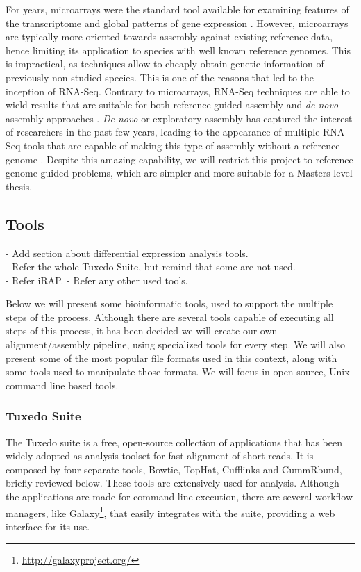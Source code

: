 For years, microarrays were the standard tool available for examining features
of the transcriptome and global patterns of gene expression \cite{Wolf2013}.
However, microarrays are typically more oriented towards assembly against
existing reference data, hence limiting its application to species with well
known reference genomes. This is impractical, as \ngs{} techniques allow to
cheaply obtain genetic information of previously non-studied species. This is
one of the reasons that led to the inception of RNA-Seq. Contrary to
microarrays, RNA-Seq techniques are able to wield results that are suitable for
both reference guided assembly and \textit{de novo} assembly approaches
\cite{Wilhelm2009}. \textit{De novo} or exploratory assembly has captured the
interest of researchers in the past few years, leading to the appearance of
multiple RNA-Seq tools that are capable of making this type of assembly without
a reference genome \cite{nuno11:assemblathon}. Despite this amazing capability,
we will restrict this project to reference genome guided problems, which are
simpler and more suitable for a Masters level thesis.

\subsection{\rnaseq{} Tools}\label{sec:seqtools}

\begin{Notes}
- Add section about differential expression analysis tools.\\
- Refer the whole Tuxedo Suite, but remind that some are not used.\\
- Refer iRAP.
- Refer any other used tools.
\end{Notes}

Below we will present some bioinformatic tools, used to support the multiple
steps of the \rnaseq{} process. Although there are several tools capable of
executing all steps of this process, it has been decided we will create our own
alignment/assembly pipeline, using specialized tools for every step. We will also present
some of the most popular file formats used in this context, along with some
tools used to manipulate those formats. We will focus in open source, Unix
command line based tools.

\subsubsection*{Tuxedo Suite}

The Tuxedo suite is a free, open-source collection of applications that has been
widely adopted as analysis toolset for fast alignment of short reads. It is
composed by four separate tools, Bowtie, TopHat, Cufflinks and CummRbund,
briefly reviewed below. These tools are extensively used for \rnaseq{} analysis.
Although the applications are made for command line execution, there are several
workflow managers, like Galaxy\footnote{\url{http://galaxyproject.org/}}, that
easily integrates with the suite, providing a web interface for its use.

